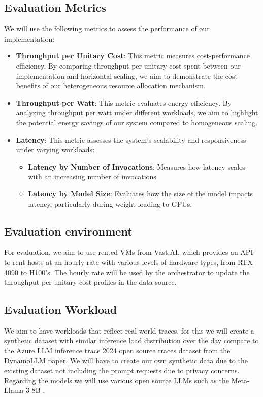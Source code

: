 \subsection{Evaluation Metrics}

We will use the following metrics to assess the performance of our implementation:
\begin{itemize}
    \item \textbf{Throughput per Unitary Cost}: This metric measures cost-performance efficiency. By comparing throughput per unitary cost spent between our implementation and horizontal scaling, we aim to demonstrate the cost benefits of our heterogeneous resource allocation mechanism.
    \item \textbf{Throughput per Watt}: This metric evaluates energy efficiency. By analyzing throughput per watt under different workloads, we aim to highlight the potential energy savings of our system compared to homogeneous scaling.
    \item \textbf{Latency}: This metric assesses the system’s scalability and responsiveness under varying workloads:
    \begin{itemize}
        \item \textbf{Latency by Number of Invocations}: Measures how latency scales with an increasing number of invocations.
        \item \textbf{Latency by Model Size}: Evaluates how the size of the model impacts latency, particularly during weight loading to GPUs.
    \end{itemize}
\end{itemize}

\subsection{Evaluation environment}

For evaluation, we aim to use rented VMs from Vast.AI, which provides an API to rent hosts at an hourly rate with various levels of hardware types, from RTX 4090 to H100's. The hourly rate will be used by the orchestrator to update the throughput per unitary cost profiles in the data source.

\subsection{Evaluation Workload}

We aim to have workloads that reflect real world traces, for this we will create a synthetic dataset with similar inference load distribution over the day compare to the Azure LLM inference trace 2024 open source traces dataset from the DynamoLLM \cite{dynamollm} paper. We will have to create our own synthetic data due to the existing dataset not including the prompt requests due to privacy concerns. Regarding the models we will use various open source LLMs such as the Meta-Llama-3-8B \cite{llama3}.

